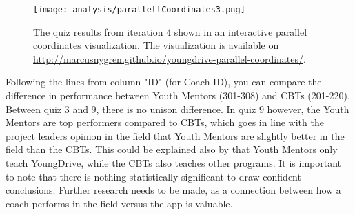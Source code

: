 \begin{figure}[h]
    \centering
    \texttt{[image: analysis/parallellCoordinates3.png]}
    \caption{The quiz results from iteration 4 shown in an interactive parallel coordinates visualization. The visualization is available on \url{http://marcusnygren.github.io/youngdrive-parallel-coordinates/}.}
    \label{fig:parallellCoordinates3}
\end{figure}

\clearpage



Following the lines from column "ID" (for Coach ID), you can compare the difference in performance between Youth Mentors (301-308) and CBTs (201-220). Between quiz 3 and 9, there is no unison difference. In quiz 9 however, the Youth Mentors are top performers compared to CBTs, which goes in line with the project leaders opinion in the field that Youth Mentors are slightly better in the field than the CBTs. This could be explained also by that Youth Mentors only teach YoungDrive, while the CBTs also teaches other programs. It is important to note that there is nothing statistically significant to draw confident conclusions. Further research needs to be made, as a connection between how a coach performs in the field versus the app is valuable. %



